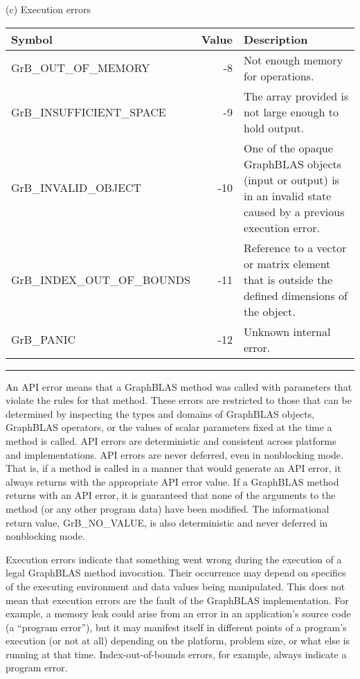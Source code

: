 \begin{table}[bh]
\begin{center}
\vspace{1\baselineskip}
(c) Execution errors
\vspace{1\baselineskip}

\begin{tabular}{l|r|p{3in}}
Symbol    & Value & Description \\ \hline
{\sf GrB\_OUT\_OF\_MEMORY}        &  -8 & Not enough memory for operations. \\
{\sf GrB\_INSUFFICIENT\_SPACE}    &  -9 & The array provided is not large enough to hold output. \\
{\sf GrB\_INVALID\_OBJECT}        & -10 & One of the opaque GraphBLAS objects (input or output) is in an invalid state caused by a previous execution error. \\
{\sf GrB\_INDEX\_OUT\_OF\_BOUNDS} & -11 & Reference to a vector or matrix element that is outside the defined dimensions of the object. \\
{\sf GrB\_PANIC}                  & -12 & Unknown internal error. \\
\end{tabular}

\end{center}
\hrule
\end{table}

An API error means that a GraphBLAS method was called with parameters
that violate the rules for that method.  These errors are restricted
to those that can be determined by inspecting the types and domains of
GraphBLAS objects, GraphBLAS operators, or the values of scalar parameters
fixed at the time a method is called.  API errors are deterministic and
consistent across platforms and implementations.  API errors are never
deferred, even in nonblocking mode. That is, if a method is called in
a manner that would generate an API error, it always returns with the
appropriate API error value.  If a GraphBLAS method returns with an
API error, it is guaranteed that none of the arguments to the method
(or any other program data) have been modified.  The informational return
value, {\sf GrB\_NO\_VALUE}, is also deterministic and never deferred in 
nonblocking mode.

Execution errors indicate that something went wrong during the execution
of a legal GraphBLAS method invocation.  Their occurrence may depend on
specifics of the executing environment and data values being manipulated.
This does not mean that execution errors are the fault of the GraphBLAS
implementation.  For example, a memory leak could arise from an error in
an application's source code (a ``program error''), but it may manifest
itself in different points of a program's execution (or not at all)
depending on the platform, problem size, or what else is running at
that time.  Index-out-of-bounds errors, for example, always indicate a
program error.

